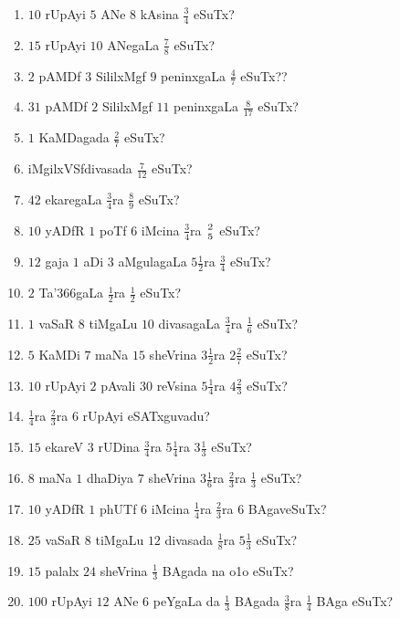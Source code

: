\begin{enumerate}[\rm(1)]
\item $10$ rUpAyi $5$ ANe $8$ kAsina $\frac{3}{4}$ eSuTx?

\item $15$ rUpAyi $10$ ANegaLa $\frac{7}{8}$ eSuTx?

\item $2$ pAMDf $3$ SililxMgf $9$ peninxgaLa $\frac{4}{7}$ eSuTx??

\item $31$ pAMDf $2$ SililxMgf $11$ peninxgaLa $\frac{8}{17}$ eSuTx?

\item $1$ KaMDagada $\frac{2}{7}$ eSuTx?

\item iMgilxVSfdivasada $\frac{7}{12}$ eSuTx?

\item $42$ ekaregaLa $\frac{3}{4}$ra $\frac{8}{9}$ eSuTx?

\item $10$ yADfR $1$ poTf $6$ iMcina $\frac{3}{4}$ra $ {2} \above 0pt {5}$ eSuTx?

\item $12$ gaja $1$ aDi $3$ aMgulagaLa $5\frac{1}{2}$ra $\frac{3}{4}$ eSuTx?

\item $2$ Ta\char'366gaLa $\frac{1}{2}$ra $\frac{1}{2}$ eSuTx?

\item $1$ vaSaR $8$ tiMgaLu $10$ divasagaLa $\frac{3}{4}$ra $\frac{1}{6}$ eSuTx?

\item $5$ KaMDi $7$ maNa $15$ sheVrina $3\frac{1}{2}$ra $2\frac{2}{7}$ eSuTx?

\item $10$ rUpAyi $2$ pAvali $30$ reVsina $5\frac{1}{4}$ra $4\frac{2}{3}$ eSuTx?
\item $\frac{1}{4}$ra $\frac{2}{3}$ra $6$ rUpAyi eSATxguvadu?

\item $15$ ekareV $3$ rUDina $\frac{3}{4}$ra $5\frac{1}{4}$ra $3\frac{1}{3}$ eSuTx?
\item $8$ maNa $1$ dhaDiya $7$ sheVrina $3\frac{1}{6}$ra $\frac{2}{3}$ra $\frac{1}{3}$ eSuTx?

\item $10$ yADfR $1$ phUTf $6$ iMcina $\frac{1}{4}$ra $\frac{2}{3}$ra $6$ BAgaveSuTx?
\item $25$ vaSaR $8$ tiMgaLu $12$ divasada $\frac{1}{8}$ra $5\frac{1}{3}$ eSuTx?

\item $15$ palalx $24$ sheVrina $\frac{1}{3}$ BAgada \SU na {\rm o1o\RU} eSuTx?

\item $100$ rUpAyi $12$ ANe $6$ peYgaLa \MU da $\frac{1}{3}$ BAgada $\frac{3}{8}$ra $\frac{1}{4}$ BAga eSuTx?
\end{enumerate}
